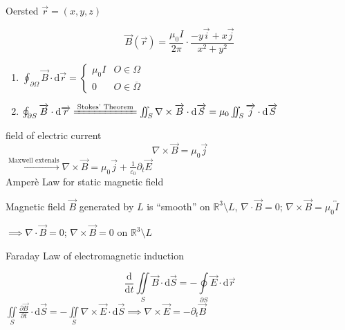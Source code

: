 \begin{example}
    Oersted $\overrightarrow{r}=(x,y,z)$

    $$\overrightarrow{B}(\overrightarrow{r})=\frac{\mu_0I}{2\pi}\cdot\frac{-y\overrightarrow{i}+x\overrightarrow{j}}{x^2+y^2}$$

    \begin{enumerate}
        \item $\oint_{\partial\Omega}\overrightarrow{B}\cdot\mathrm{d}\overrightarrow{r}=\begin{cases}
                      \mu_0I & O\in\Omega            \\
                      0      & O\in\overline{\Omega}
                  \end{cases}$
        \item $\oint_{\partial S}\overrightarrow{B}\cdot\mathrm{d}\overrightarrow{r}\xlongequal{\text{Stokes' Theorem}}\iint_S\nabla\times\overrightarrow{B}\cdot\mathrm{d}\overrightarrow{S}=\mu_0\iint_S\overrightarrow{j}\cdot\mathrm{d}\overrightarrow{S}$
    \end{enumerate}
\end{example}

field of electric current
$$\nabla\times\overrightarrow{B}=\mu_0\overrightarrow{j}$$
$\xrightarrow{\text{Maxwell extenals}}\nabla\times\overrightarrow{B}=\mu_0\overrightarrow{j}+\frac{1}{\varepsilon_0}\partial_t\overrightarrow{E}$\\
Amperè Law for static magnetic field

\begin{example}
    Magnetic field $\overrightarrow{B}$ generated by $L$ is ``smooth'' on $\mathbb{R}^3\setminus L$, $\nabla\cdot\overrightarrow{B}=0$; $\nabla\times\overrightarrow{B}=\mu_0\overleftrightarrow{I}$

    $\implies\nabla\cdot\overrightarrow{B}=0$; $\nabla\times\overrightarrow{B}=0$ on $\mathbb{R}^3\setminus L$
\end{example}

Faraday Law of electromagnetic induction

$$\frac{\mathrm{d}}{\mathrm{d}t}\iint\limits_S\overrightarrow{B}\cdot\mathrm{d}\overrightarrow{S}=-\oint\limits_{\partial S}\overrightarrow{E}\cdot\mathrm{d}\overrightarrow{r}$$
$\iint\limits_S\frac{\partial\overrightarrow{B}}{\partial t}\cdot\mathrm{d}\overrightarrow{S}=-\iint\limits_S\nabla\times\overrightarrow{E}\cdot\mathrm{d}\overrightarrow{S}\implies\nabla\times\overrightarrow{E}=-\partial_t\overrightarrow{B}$

